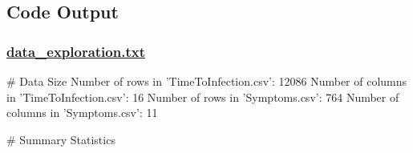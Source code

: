 \documentclass[11pt]{article}
\begin{document}
\subsection{Code Output}\hypertarget{file-data-exploration-txt}{}

\subsubsection*{\hyperlink{code-Data Exploration-data-exploration-txt}{data\_exploration.txt}}

\begin{codeoutput}
\# Data Size
Number of rows in 'TimeToInfection.csv': 12086
Number of columns in 'TimeToInfection.csv': 16
Number of rows in 'Symptoms.csv': 764
Number of columns in 'Symptoms.csv': 11

\# Summary Statistics


\end{codeoutput}
\end{document}
